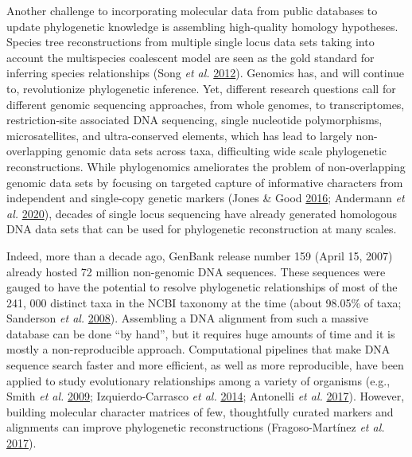 \documentclass[]{article}
\begin{document}
Another challenge to incorporating molecular data from public databases to update phylogenetic knowledge is assembling high-quality homology hypotheses.
Species tree reconstructions from multiple single locus data sets taking into account the multispecies coalescent model are seen as the gold standard for inferring species relationships (Song \emph{et al.} \protect\hyperlink{ref-song2012resolving}{2012}).
Genomics has, and will continue to, revolutionize phylogenetic inference.
Yet, different research questions call for different genomic sequencing approaches, from whole genomes, to transcriptomes, restriction-site associated DNA sequencing, single nucleotide polymorphisms, microsatellites, and ultra-conserved elements, which has lead to largely non-overlapping genomic data sets across taxa, difficulting wide scale phylogenetic reconstructions.
While phylogenomics ameliorates the problem of non-overlapping genomic data sets by focusing on targeted capture of informative characters from independent and single-copy genetic markers (Jones \& Good \protect\hyperlink{ref-jones2016targeted}{2016}; Andermann \emph{et al.} \protect\hyperlink{ref-andermann2020guide}{2020}), decades of single locus sequencing have already generated homologous DNA data sets that can be used for phylogenetic reconstruction at many scales.

Indeed, more than a decade ago, GenBank release number 159 (April 15, 2007) already hosted 72 million non-genomic DNA sequences. These sequences were gauged to have the potential to resolve phylogenetic relationships of most of the 241, 000 distinct taxa in the NCBI taxonomy at the time (about 98.05\% of taxa; Sanderson \emph{et al.} \protect\hyperlink{ref-sanderson2008phylota}{2008}). Assembling a DNA alignment from such a massive database can be done ``by hand'', but it requires huge amounts of time and it is mostly a non-reproducible approach. Computational pipelines that make DNA sequence search faster and more efficient, as well as more reproducible, have been applied to study evolutionary relationships among a variety of organisms (e.g., Smith \emph{et al.} \protect\hyperlink{ref-smith2009mega}{2009}; Izquierdo-Carrasco \emph{et al.} \protect\hyperlink{ref-izquierdo2014pumper}{2014}; Antonelli \emph{et al.} \protect\hyperlink{ref-antonelli2017toward}{2017}).
However, building molecular character matrices of few, thoughtfully curated markers and alignments can improve phylogenetic reconstructions (Fragoso-Martínez \emph{et al.} \protect\hyperlink{ref-fragoso2017pilot}{2017}).
\end{document}
